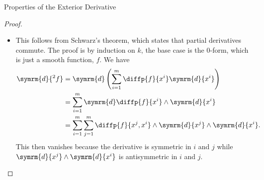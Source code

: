 \documentclass[fleqn]{NotesClass}
\renewcommand{\dl}{\symrm{d}}
\begin{document}
\begin{lma}{Properties of the Exterior Derivative}{}
\begin{proof}
\begin{itemize}
\begin{align}
                    &= \dl{(fg)} \wedge (\dl{x^I} \wedge \dl{x^J})\\
                    &= ((\dl{f})g + f \dl{g}) \wedge \dl{x^I} \wedge \dl{x^J}\\
                    &= \dl{f} \wedge \dl{x^I} \wedge g \dd{x^J} + \dl{g} \wedge f\dd{x^I} \wedge \dl{x^J}\\
                    &= \dl{f} \wedge \dl{x^I} \wedge g \dd{x^J} + (-1)^k f\dd{x^I} \wedge \dl{g} \wedge \dl{x^J}\\
                    &= \dl{\omega} \wedge \tau + (-1)^k \omega \wedge \dl{\tau}
                \end{align}
                where we've used the Leibniz rule for the exterior derivative of 0-forms, which we know holds because it's just the derivative, and the anticommutativity of the wedge product.
                \item This follows from Schwarz's theorem, which states that partial derivatives commute.
                The proof is by induction on \(k\), the base case is the \(0\)-form, which is just a smooth function, \(f\).
                We have
                \begin{align}
                    \dl{^2f} &= \dl\left( \sum_{i=1}^{m} \diffp{f}{x^i} \dl{x^i} \right)\\
                    &= \sum_{i=1}^m \dl\diffp{f}{x^i} \wedge \dl{x^i}\\
                    &= \sum_{i=1}^m \sum_{j=1}^m \diffp{f}{x^j,x^i} \wedge \dl{x^j} \wedge \dl{x^i}.
                \end{align}
                This then vanishes because the derivative is symmetric in \(i\) and \(j\) while \(\dl{x^j} \wedge \dl{x^i}\) is antisymmetric in \(i\) and \(j\).
                

\end{itemize}
\end{proof}
\end{lma}
\end{document}
